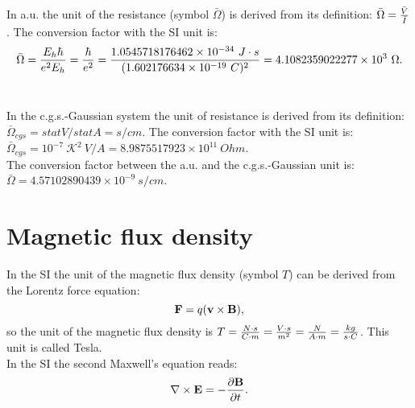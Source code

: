 \documentclass[12pt,a4paper]{article}
\def\hbarf{1.0545718176462\times 10^{-34}}
\def\barc{1.602176634\times 10^{-19}}
\def\barohm{4.1082359022277\times 10^{3}}
\def\ohmtoohm{8.9875517923\times 10^{11}}
\def\barohmcgs{4.57102890439\times 10^{-9}}
\begin{document}
{\color{web-blue} In a.u. the unit of the resistance (symbol $\bar \Omega$) 
is derived from its definition: $\bar \Omega={\bar V \over \bar I}$. The
conversion factor with the SI unit is:
\begin{equation}
\bar \Omega = {E_h \hbar \over e^2 E_h}=  
{\hbar \over e^2}=
{\hbarf\ J\cdot s\over (\barc\ C)^2}=\barohm\ \Omega.
\end{equation}
\\
}

{\color{orange} In the c.g.s.-Gaussian system the unit of resistance
is derived from its definition:
$\bar \Omega_{cgs}=statV/statA=s/cm$. The conversion factor with the SI 
unit is:
$\bar \Omega_{cgs}=10^{-7}\ \mathcal{K}^2\ V/A=\ohmtoohm\ Ohm$.
}
\\

{\color{green}
The conversion factor between the a.u. and the c.g.s.-Gaussian unit
is: $\bar \Omega = \barohmcgs \ s/cm$.
}


\newpage
\section{\color{coral}Magnetic flux density}
In the SI the unit of the magnetic flux density 
(symbol $T$) can be derived from the Lorentz force equation:
\begin{equation}
{\bf F}=q ({\bf v} \times {\bf B}),
\label{lforce}
\end{equation}
so the unit of the magnetic flux density is $T={N\cdot s\over C\cdot m} = 
{V \cdot s \over m^2}={N \over A\cdot m}={kg \over s \cdot C}$. 
This unit is called Tesla. \\
In the SI the second Maxwell's equation reads:
\begin{equation}
\nabla \times {\bf E}=-{\partial {\bf B} \over \partial t}.
\end{equation}
\\
\end{document}
